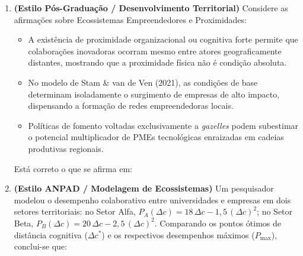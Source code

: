 \begin{enumerate}[leftmargin=1.6em, itemsep=8pt]
  \item \textbf{(Estilo Pós-Graduação / Desenvolvimento Territorial)} Considere as afirmações sobre Ecossistemas Empreendedores e Proximidades:
  \begin{itemize}[leftmargin=1.2em, itemsep=2pt]
    \item[I.] A existência de proximidade organizacional ou cognitiva forte permite que colaborações inovadoras ocorram mesmo entre atores geograficamente distantes, mostrando que a proximidade física não é condição absoluta.
    \item[II.] No modelo de Stam \& van de Ven (2021), as condições de base determinam isoladamente o surgimento de empresas de alto impacto, dispensando a formação de redes empreendedoras locais.
    \item[III.] Políticas de fomento voltadas exclusivamente a \textit{gazelles} podem subestimar o potencial multiplicador de PMEs tecnológicas enraizadas em cadeias produtivas regionais.
  \end{itemize}
  Está correto o que se afirma em:

  \item \textbf{(Estilo ANPAD / Modelagem de Ecossistemas)} Um pesquisador modelou o desempenho colaborativo entre universidades e empresas em dois setores territoriais: no Setor Alfa, $P_A(\Delta c) = 18\,\Delta c - 1{,}5\,(\Delta c)^2$; no Setor Beta, $P_B(\Delta c) = 20\,\Delta c - 2{,}5\,(\Delta c)^2$. Comparando os pontos ótimos de distância cognitiva ($\Delta c^*$) e os respectivos desempenhos máximos ($P_{\max}$), conclui-se que:


\end{enumerate}
